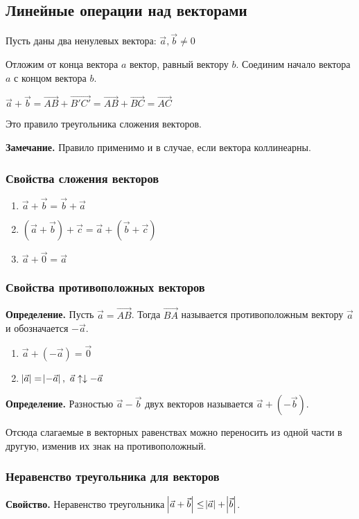 \documentclass{article}
\begin{document}
    \subsection{Линейные операции над векторами}

    Пусть даны два ненулевых вектора: \( \overrightarrow{a}, \overrightarrow{b} \neq 0 \)
    
    Отложим от конца вектора $a$ вектор, равный вектору $b$. Соединим начало вектора $a$ с концом вектора $b$.
    
    \( \overrightarrow{a} + \overrightarrow{b} = \overrightarrow{AB} + \overrightarrow{B'C'} = \overrightarrow{AB} + \overrightarrow{BC} = \overrightarrow{AC} \)

    Это правило треугольника сложения векторов.

    \textbf{Замечание.} Правило применимо и в случае, если вектора коллинеарны.
    
    \subsubsection{Свойства сложения векторов}
    
    \begin{enumerate}
        \item \(\vec{a} + \vec{b} = \vec{b} + \vec{a}\)
        \item \((\vec{a} + \vec{b}) + \vec{c} = \vec{a} + (\vec{b} + \vec{c})\)
        \item \(\vec{a} + \vec{0} = \vec{a}\)
    \end{enumerate}

    \subsubsection{Свойства противоположных векторов}

    \textbf{Определение.} Пусть \(\vec{a} = \vec{AB}\). Тогда \(\vec{BA}\) называется противоположным вектору \(\vec{a}\) и обозначается \(-\vec{a}\).

    \begin{enumerate}
        \item \(\vec{a} + (-\vec{a}) = \vec{0}\)
        \item \(\abs{\vec{a}}=\abs{-\vec{a}},\ \vec{a} \uparrow\downarrow -\vec{a}\)
    \end{enumerate}

    \textbf{Определение.} Разностью \(\vec a - \vec b\) двух векторов называется \(\vec a + (-\vec b)\).

    Отсюда слагаемые в векторных равенствах можно переносить из одной части в другую, изменив их знак на противоположный.

    \subsubsection{Неравенство треугольника для векторов}

    \textbf{Свойство.} Неравенство треугольника \(\abs{\vec a + \vec b} \leq \abs{\vec a} + \abs{\vec b}\).
\end{document}
